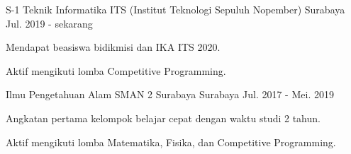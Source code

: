 

\begin{cventries}

  \cventry
    {S-1 Teknik Informatika} %
    {ITS (Institut Teknologi Sepuluh Nopember)} %
    {Surabaya} %
    {Jul. 2019 - sekarang} %
    {
      \begin{cvitems} %
        \item {Mendapat beasiswa bidikmisi dan IKA ITS 2020.}
        \item {Aktif mengikuti lomba Competitive Programming.}
      \end{cvitems}
    }

  \cventry
    {Ilmu Pengetahuan Alam} %
    {SMAN 2 Surabaya} %
    {Surabaya} %
    {Jul. 2017 - Mei. 2019} %
    {
      \begin{cvitems} %
        \item {Angkatan pertama kelompok belajar cepat dengan waktu studi 2 tahun.}
        \item {Aktif mengikuti lomba Matematika, Fisika, dan Competitive Programming.}
      \end{cvitems}
    }

\end{cventries}
